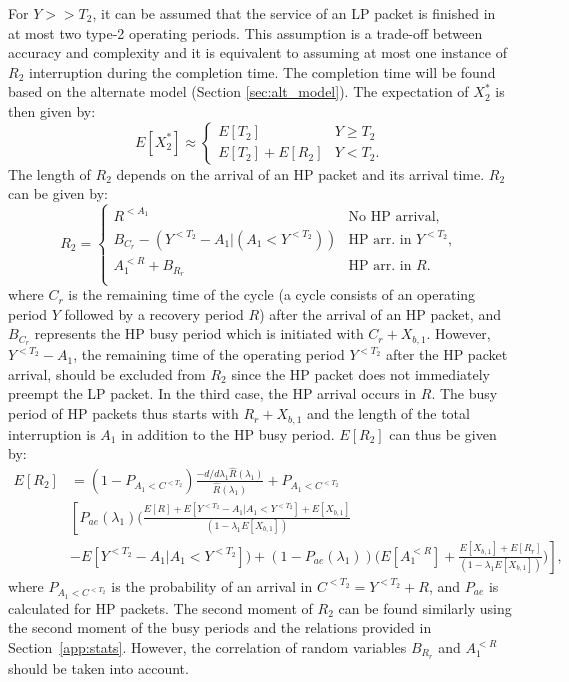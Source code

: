 \documentclass[11pt,journal,oneside,onecolumn,draftclsnofoot]{IEEEtran}
\begin{document}
For $Y >> T_2$, it can be assumed that the service of an LP packet is finished in at most two type-2 operating periods. This assumption is a trade-off between accuracy and complexity and it is  equivalent to assuming at most one instance of $R_2$ interruption during the completion time. The completion time will be found based on the alternate model (Section \ref{sec:alt_model}). The expectation of $X^*_2$ is then given by:
\begin{equation}
E[X^*_2] \approx \begin{cases}
E[T_2]& Y \geq T_2 \\
E[T_2]+E[R_2]& Y<T_2.
\end{cases}
\label{eq:}
\end{equation}
The length of $R_2$ depends on the arrival of an HP packet and its arrival time. 
$R_2$ can be given by:
\begin{equation}
R_2=\begin{cases}
R^{<A_1}& \mbox{No HP arrival},\\
B_{C_r}-(Y^{<T_2}-A_1|(A_1<Y^{<T_2}))& \mbox{HP arr. in $Y^{<T_2}$},\\
A_1^{<R}+B_{R_r}& \mbox{HP arr. in $R$}.\\
\end{cases}
\label{eq:R2-appx1-newpr}
\end{equation}
where $C_r$ is the remaining time of the cycle (a cycle consists of an operating period $Y$ followed by a recovery period $R$) after the arrival of an HP packet, and $B_{C_r}$ represents the HP busy period which is initiated with $C_r+X_{b,1}$. However, $Y^{<T_2}-A_1$, the remaining time of the operating period $Y^{<T_2}$ after the HP packet arrival, should be excluded from $R_2$ since the HP packet does not immediately preempt the LP packet. In the third case, the HP arrival occurs in $R$. The busy period of HP packets thus starts with $R_{r}+X_{b,1}$ and the length of the total interruption is $A_1$ in addition to the HP busy period. $E[R_2]$ can thus be given by:
\begin{align}
E[R_2]&=(1-P_{A_1<C^{<T_2}}) \frac{-d/d\lambda_1 \widehat{R}(\lambda_1)}{\widehat{R}(\lambda_1)} +P_{A_1<C^{<T_2}}\nonumber\\
& \left[P_{ae}(\lambda_1)\Bigg(\frac{E[R]+E[Y^{<T_2}-A_1|A_1<Y^{<T_2}]+E[X_{b,1}]}{(1-\lambda_1E[X_{b,1}])} \right. \nonumber\\
& \left. -E[Y^{<T_2}-A_1|A_1<Y^{<T_2}]\Bigg)+(1-P_{ae}(\lambda_1))\Bigg(E[A_1^{<R}] + \frac{E[X_{b,1}]+E[R_r]}{(1-\lambda_1E[X_{b,1}])}\Bigg)\right],
\label{eq:eq:R2-appx2-newpr}
\end{align}
where $P_{A_1<C^{<T_2}}$ is the probability of an arrival in $C^{<T_2}=Y^{<T_2}+R$, and $P_{ae}$ is calculated for HP packets. The second moment of $R_2$ can be found similarly using the second moment of the busy periods and the relations provided in Section~\ref{app:stats}. However, the correlation of random variables $B_{R_r}$ and $A_1^{<R}$ should be taken into account. 
\end{document}
